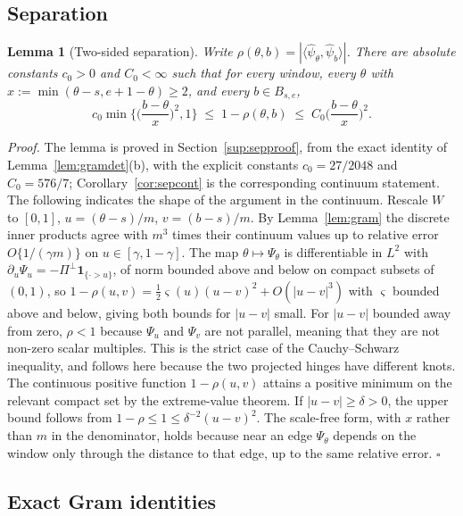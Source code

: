 \documentclass[12pt, a4paper]{article}
\newcommand{\qed}{\hfill$\square$}
\newenvironment{proof}[1][Proof]{\par\noindent\textit{#1.}\space}{\qed\par\medskip}
\newtheorem{lemma}{Lemma}[section]
\begin{document}
\subsection{Separation}

\begin{lemma}[Two-sided separation]
\label{lem:sep}
Write $\rho(\theta,b) = |\langle \hat\psi_\theta, \hat\psi_b\rangle|$. There
are absolute constants $c_0 > 0$ and $C_0 < \infty$ such that for every window,
every $\theta$ with $x := \min(\theta-s, e+1-\theta) \ge 2$, and every
$b \in B_{s,e}$,
\[
c_0 \min\Big\{ \Big(\frac{b-\theta}{x}\Big)^2, 1 \Big\} \;\le\;
1 - \rho(\theta,b) \;\le\; C_0 \Big(\frac{b-\theta}{x}\Big)^2 .
\]
\end{lemma}

\begin{proof}[Proof]
The lemma is proved in Section~\ref{sup:sepproof}, from the exact identity of Lemma~\ref{lem:gramdet}(b), with the explicit constants $c_0 = 27/2048$ and $C_0 = 576/7$; Corollary~\ref{cor:sepcont} is the corresponding continuum statement. The following indicates the shape of the argument in the continuum. Rescale $W$ to $[0,1]$, $u = (\theta-s)/m$, $v = (b-s)/m$. By
Lemma~\ref{lem:gram} the discrete inner products agree with $m^3$ times their
continuum values up to relative error $O\{1/(\gamma m)\}$ on
$u \in [\gamma,1-\gamma]$. The map $\theta \mapsto \Psi_\theta$ is
differentiable in $L^2$ with
$\partial_u \Psi_u = -\Pi^\perp \mathbf 1_{\{\cdot > u\}}$, of norm bounded
above and below on compact subsets of $(0,1)$, so
$1 - \rho(u,v) = \tfrac12 \varsigma(u)(u-v)^2 + O(|u-v|^3)$ with $\varsigma$
bounded above and below, giving both bounds for $|u-v|$ small. For $|u-v|$
bounded away from zero, $\rho < 1$ because $\Psi_u$ and $\Psi_v$ are not
parallel, meaning that they are not non-zero scalar multiples. This is the
strict case of the Cauchy--Schwarz inequality, and follows here because the two
projected hinges have different knots. The continuous positive function
$1-\rho(u,v)$ attains a positive minimum on the relevant compact set by the
extreme-value theorem. If $|u-v|\ge\delta>0$, the upper bound follows from
$1-\rho\le1\le\delta^{-2}(u-v)^2$. The scale-free form, with $x$ rather than
$m$ in the denominator, holds because near an edge $\Psi_\theta$ depends on the
window only through the distance to that edge, up to the same relative error.
\end{proof}

\subsection{Exact Gram identities}
\label{sup:gramid}
\end{document}
